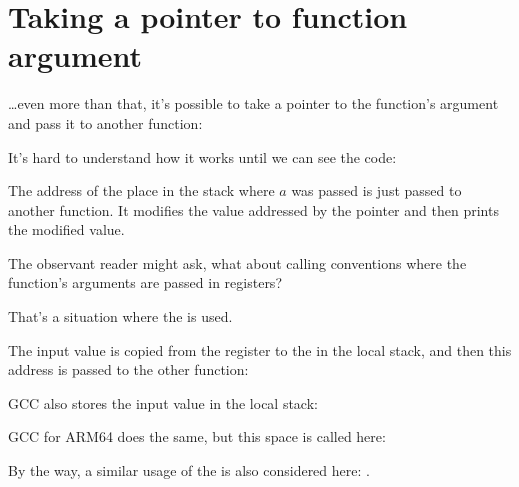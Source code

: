 \section{Taking a pointer to function argument}
\label{pointer_to_argument}

\dots even more than that, it's possible to take a pointer to the function's argument and pass
it to another function:



It's hard to understand how it works until we can see the code:



The address of the place in the stack where $a$ was passed is just passed to another function.
It modifies the value addressed by the pointer and then \printf prints the modified value.

\par The observant reader might ask, what about calling conventions where the function's arguments are
passed in registers?

That's a situation where the  is used.

The input value is copied from the register
to the  in the local stack, and then this address is passed to the other function:



GCC also stores the input value in the local stack:



GCC for ARM64 does the same, but this space is called  here:



By the way, a similar usage of the  is also considered here: .

